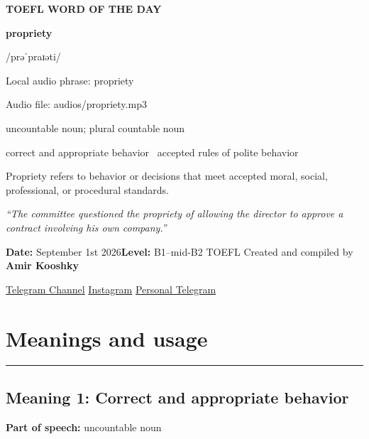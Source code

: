 \documentclass[11pt]{article}
\newcommand{\sectionrule}{\par\vspace{-0.5em}\noindent\textcolor{Accent}{\rule{\linewidth}{0.6pt}}\par}
\begin{document}
\begin{center}
{\sffamily\bfseries\color{Accent} TOEFL WORD OF THE DAY\par}
\vspace{8mm}
{\fontsize{42}{48}\selectfont\bfseries propriety\par}
\vspace{2mm}
{\Large\sffamily\color{Accent} /prəˈpraɪəti/\par}
\vspace{2mm}
{\small\sffamily Local audio phrase: propriety\par}
{\small\sffamily Audio file: audios/propriety.mp3\par}
\vspace{2mm}
{\large\sffamily\color{Muted} uncountable noun; plural countable noun\par}
\vspace{5mm}
{\sffamily correct and appropriate behavior \textbullet\ accepted rules of polite behavior\par}
\vspace{6mm}
{\large Propriety refers to behavior or decisions that meet accepted moral, social, professional, or procedural standards.\par}
\vspace{6mm}
\begin{minipage}{0.84\textwidth}
\itshape “The committee questioned the propriety of allowing the director to approve a contract involving his own company.”
\end{minipage}\par
\vspace{10mm}
\textbf{Date:} September 1st 2026\quad\textbullet\quad \textbf{Level:} B1--mid-B2 TOEFL
\vfill
Created and compiled by \textbf{Amir Kooshky}\par
\vspace{2mm}
\href{https://t.me/KooshkyTOEFL}{Telegram Channel}\quad\textbullet\quad
\href{https://www.instagram.com/kooshkytoefl}{Instagram}\quad\textbullet\quad
\href{https://t.me/KooshkyTOEFL\_pv}{Personal Telegram}
\end{center}
\newpage
\tableofcontents
\newpage

\section{Meanings and usage}
\sectionrule
\subsection{Meaning 1: Correct and appropriate behavior}
\textbf{Part of speech:} uncountable noun
\end{document}
